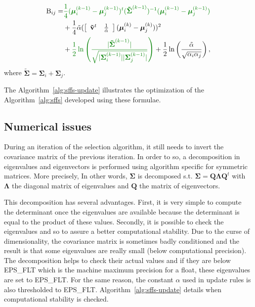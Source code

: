 \documentclass[journal,peerreview,onecolumn]{IEEEtran}
\begin{document}
        \begin{align}
        \label{eq:jm-update}
            \text{B}_{ij} = &\textcolor[rgb]{0,0.5,0}{\frac{1}{4} (\boldsymbol{\mu}_i^{(k-1)} - \boldsymbol{\mu}_j^{(k-1)})^t ( \boldsymbol{\tilde{\Sigma}}^{(k-1)} )^{-1} (\boldsymbol{\mu}_i^{(k-1)} - \boldsymbol{\mu}_j^{(k-1)})} \nonumber \\
            &+ \frac{1}{4} \tilde{\alpha} ( \left[\begin{array}{cc} \mathbf{\tilde{v}}^t & \frac{1}{\tilde{\alpha}} \end{array}\right] (\boldsymbol{\mu}_{i}^{(k)} - \boldsymbol{\mu}_{j}^{(k)}) )^2 \nonumber \\
            &+ \textcolor[rgb]{0,0.5,0}{\frac{1}{2} \ln \left( \frac{|\boldsymbol{\tilde{\Sigma}}^{(k-1)}|}{\sqrt{|\boldsymbol{\Sigma}_i^{(k-1)}| |\boldsymbol{\Sigma}_j^{(k-1)}|}} \right)} + \frac{1}{2} \ln \left( \frac{\tilde{\alpha}}{\sqrt{\alpha_i \alpha_j}} \right),
        \end{align}
        where $\boldsymbol{\tilde{\Sigma}} = \boldsymbol{\Sigma}_i + \boldsymbol{\Sigma}_j$.

        The Algorithm~\ref{alg:sffs-update} illustrates the optimization of the Algorithm~\ref{alg:sffs} developed using these formulae.

    \subsection{Numerical issues}

    During an iteration of the selection algorithm, it still needs to invert the covariance matrix of the previous iteration. In order to so, a decomposition in eigenvalues and eigenvectors is performed using algorithm specific for symmetric matrices. More precisely, In other words, $\boldsymbol{\Sigma}$ is decomposed s.t. $\boldsymbol{\Sigma} = \mathbf{Q} \boldsymbol{\Lambda} \mathbf{Q}^t$ with $\boldsymbol{\Lambda}$ the diagonal matrix of eigenvalues and $\mathbf{Q}$ the matrix of eigenvectors.

    This decomposition has several advantages. First, it is very simple to compute the determinant once the eigenvalues are available because the determinant is equal to the product of these values. Secondly, it is possible to check the eigenvalues and so to assure a better computational stability. Due to the curse of dimensionality, the covariance matrix is sometimes badly conditioned and the result is that some eigenvalues are really small (below computational precision). The decomposition helps to check their actual values and if they are below EPS\_FLT which is the machine maximum precision for a float, these eigenvalues are set to EPS\_FLT. For the same reason, the constant $\alpha$ used in update rules is also thresholded to EPS\_FLT. Algorithm~\ref{alg:sffs-update} details when computational stability is checked.
\end{document}
